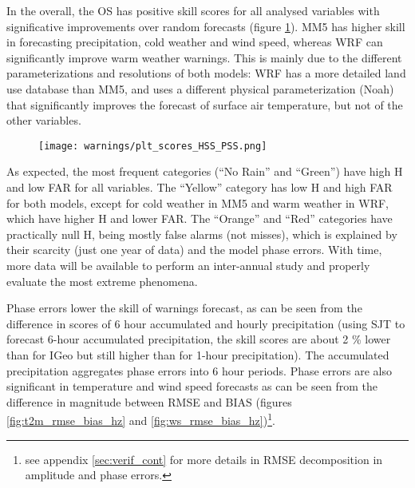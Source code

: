 In the overall, the OS has positive skill scores for all analysed variables  with significative improvements over random forecasts (figure \ref{fig:ss}). MM5 has higher skill in forecasting precipitation, cold weather and wind speed, whereas WRF can significantly improve warm weather warnings. This is mainly due to the different parameterizations and resolutions of both models: WRF has a more detailed land use database than MM5, and uses a different physical parameterization (Noah) that significantly improves the forecast of surface air temperature, but not of the other variables. 

\begin{figure}[!htp]
    \centering
    \texttt{[image: warnings/plt\_scores\_HSS\_PSS.png]}
\label{fig:ss}
\end{figure}
\FloatBarrier

As expected, the most frequent categories (“No Rain” and “Green”) have high H and low FAR for all variables. The “Yellow” category has low H and high FAR for both models, except for cold weather in MM5 and warm weather in WRF, which have higher H and lower FAR. The “Orange” and “Red” categories have practically null H, being mostly false alarms (not misses), which is explained by their scarcity (just one year of data) and the model phase errors.  With time, more data will be available to perform an inter-annual study and properly evaluate the most extreme phenomena.

Phase errors lower the skill of warnings forecast, as can be seen from the difference in scores of 6 hour accumulated and hourly precipitation (using SJT to forecast 6-hour accumulated precipitation, the skill scores are  about 2 \% lower than for IGeo but still higher than for 1-hour precipitation). The accumulated precipitation aggregates phase errors into 6 hour periods. Phase errors are also significant in temperature and wind speed forecasts as can be seen from the difference in magnitude between RMSE and BIAS (figures \ref{fig:t2m_rmse_bias_hz} and \ref{fig:ws_rmse_bias_hz})\footnote{see appendix \ref{sec:verif_cont} for more details in RMSE decomposition in amplitude and phase errors.}.

